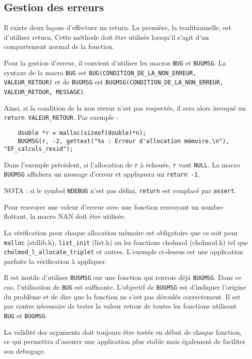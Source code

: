 \documentclass{article}
\begin{document}
\subsection{Gestion des erreurs}
Il existe deux façons d'effectuer un return. La première, la traditionnelle, est d'utiliser return. Cette méthode doit être utilisée lorsqu'il s'agit d'un comportement normal de la fonction.\par
Pour la gestion d'erreur, il convient d'utiliser les macros \texttt{BUG} et \texttt{BUGMSG}. La syntaxe de la macro \texttt{BUG} est \texttt{BUG(CONDITION\_\-DE\_\-LA\_\-NON\_\-ERREUR, VALEUR\_\-RETOUR)} et de \texttt{BUGMSG} est \texttt{BUGMSG(CONDITION\_\-DE\_LA\-\_NON\-\_ERREUR, VALEUR\_\-RETOUR, MESSAGE)}.\par
Ainsi, si la condition de la non erreur n'est pas respectée, il sera alors invoqué un \texttt{return VALEUR\_\-RETOUR}. Par exemple :\begin{verbatim}
    double *r = malloc(sizeof(double)*n);
    BUGMSG(r, -2, gettext("%s : Erreur d'allocation mémoire.\n"), "EF_calculs_resid");
\end{verbatim}\par
Dans l'exemple précédent, si l'allocation de \texttt{r} à échouée, \texttt{r} vaut \texttt{NULL}. La macro \texttt{BUGMSG} affichera un message d'erreur et appliquera un \texttt{return -1}.\par
NOTA : si le symbol \texttt{NDEBUG} n'est pas défini, \texttt{return} est remplacé par \texttt{assert}.\par
Pour renvoyer une valeur d'erreur avec une fonction renvoyant un nombre flottant, la macro NAN doit être utilisée.\par
La vérification pour chaque allocation mémoire est obligatoire que ce soit pour \texttt{malloc} (stdlib.h), \texttt{list\_init} (list.h) ou les fonctions cholmod (cholmod.h) tel que \texttt{cholmod\-\_l\-\_allocate\-\_triplet} et autres. L'exemple ci-dessus est une application parfaite la vérification à appliquer.\par
Il est inutile d'utiliser \texttt{BUGMSG} sur une fonction qui renvoie déjà \texttt{BUGMSG}. Dans ce cas, l'utilisation de \texttt{BUG} est suffisante. L'objectif de \texttt{BUGMSG} est d'indiquer l'origine du problème et de dire que la fonction ne s'est pas déroulée correctement. Il est par contre nécessaire de tester la valeur retour de toutes les fonctions utilisant \texttt{BUG} et \texttt{BUGMSG}.\par
La validité des arguments doit toujours être testée en début de chaque fonction, ce qui permettra d'assurer une application plus stable mais également de faciliter son debogage.
\end{document}
